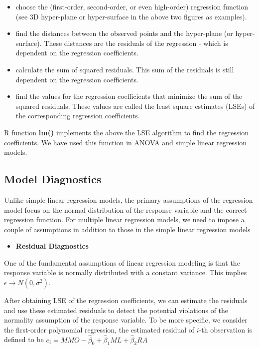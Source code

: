 \documentclass[
]{book}
\providecommand{\tightlist}{%
  \setlength{\itemsep}{0pt}\setlength{\parskip}{0pt}}
\begin{document}
\begin{itemize}
\item
  choose the (first-order, second-order, or even high-order) regression function (see 3D hyper-plane or hyper-surface in the above two figures as examples).
\item
  find the distances between the observed points and the hyper-plane (or hyper-surface). These distances are the residuals of the regression - which is dependent on the regression coefficients.
\item
  calculate the sum of squared residuals. This sum of the residuals is still dependent on the regression coefficients.
\item
  find the values for the regression coefficients that minimize the sum of the squared residuals. These values are called the least square estimates (LSEs) of the corresponding regression coefficients.
\end{itemize}

R function \textbf{lm()} implements the above the LSE algorithm to find the regression coefficients. We have used this function in ANOVA and simple linear regression models.

\hypertarget{model-diagnostics}{%
\subsection{Model Diagnostics}\label{model-diagnostics}}

Unlike simple linear regression models, the primary assumptions of the regression model focus on the normal distribution of the response variable and the correct regression function. For multiple linear regression models, we need to impose a couple of assumptions in addition to those in the simple linear regression models

\begin{itemize}
\tightlist
\item
  \textbf{Residual Diagnostics}
\end{itemize}

One of the fundamental assumptions of linear regression modeling is that the response variable is normally distributed with a constant variance. This implies \(\epsilon \to N(0, \sigma^2)\).

After obtaining LSE of the regression coefficients, we can estimate the residuals and use these estimated residuals to detect the potential violations of the normality assumption of the response variable. To be more specific, we consider the first-order polynomial regression, the estimated residual of \(i\)-th observation is defined to be \(e_i = MMO - \hat{\beta}_0 + \hat{\beta}_1 ML + \hat{\beta}_2 RA\)
\end{document}
